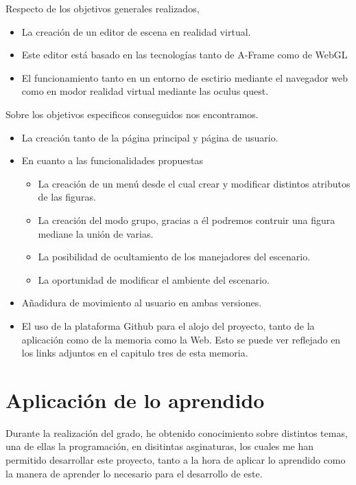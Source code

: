 \documentclass[a4paper, 12pt]{book}
\begin{document}
Respecto de los objetivos generales realizados, 

\begin{itemize}
    \item La creación de un editor de escena en realidad virtual.
    \item Este editor está basado en las tecnologías tanto de A-Frame como de WebGL
    \item El funcionamiento tanto en un entorno de esctirio mediante el navegador web como en modor realidad virtual mediante las oculus quest.
\end{itemize}

Sobre los objetivos especificos conseguidos nos encontramos. 
\begin{itemize}
    \item La creación tanto de la página principal y página de usuario.
    \item En cuanto a las funcionalidades propuestas
    \begin{itemize}
        \item La creación de un menú desde el cual crear y modificar distintos atributos de las figuras.
        \item La creación del modo grupo, gracias a él podremos contruir una figura mediane la unión de varias.
        \item La posibilidad de ocultamiento de los manejadores del escenario.
        \item La oportunidad de modificar el ambiente del escenario.
    \end{itemize}
    \item Añadidura de movimiento al usuario en ambas versiones.
    \item El uso de la plataforma Github para el alojo del proyecto, tanto de la aplicación como de la memoria como la Web. Esto se puede ver reflejado en los links adjuntos en el capitulo tres de esta memoria.
\end{itemize}

\section{Aplicación de lo aprendido}
\label{sec:aplicacion}

Durante la realización del grado, he obtenido conocimiento sobre distintos temas, una de ellas la programación, en disitintas asginaturas, los cuales me han permitido desarrollar este proyecto, tanto a la hora de aplicar lo aprendido como la manera de aprender lo necesario para el desarrollo de este.
\end{document}
